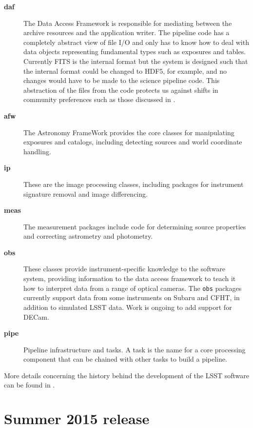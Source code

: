 \documentclass[11pt,twoside]{article}
\begin{document}
\begin{description}
\item[\textbf{daf}] The Data Access Framework is responsible for
  mediating between the archive resources and the application
  writer. The pipeline code has a completely abstract view of
  file I/O and only has to know how to deal with data objects
  representing fundamental types such as exposures and
  tables. Currently FITS is the internal format but the system is
  designed such that the internal format could be changed to HDF5, for
  example, and no changes would have to be made to the science
  pipeline code. This abstraction of the files from the code protects
  us against shifts in community preferences such as those discussed
  in \citet{2015ASPC..495...11M}.

\item[\textbf{afw}] The Astronomy FrameWork provides the
  core classes for manipulating exposures and catalogs, including
  detecting sources and world coordinate handling.

\item[\textbf{ip}] These are the image processing classes, including
  packages for instrument signature removal and image differencing.

\item[\textbf{meas}] The measurement packages include code for
  determining source properties and correcting astrometry and photometry.

\item[\textbf{obs}] These classes provide instrument-specific
  knowledge to the software system, providing information to the data
  access framework to teach it how to interpret data from a range of
  optical cameras. The \texttt{obs} packages currently support data
  from some instruments on Subaru and CFHT, in addition to simulated
  LSST data. Work is ongoing to add support for DECam.

\item[\textbf{pipe}] Pipeline infrastructure and tasks. A task is the
  name for a core processing component that can be chained with other
  tasks to build a pipeline.

\end{description}

More details concerning the history behind the development of the
LSST software can be found in \citet{2010SPIE.7740E..15A}.

\section{Summer 2015 release}
\end{document}
